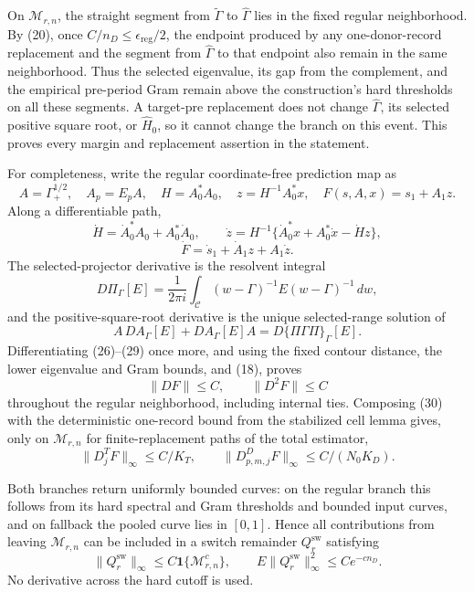 On \(\mathcal M_{r,n}\), the straight segment from
\(\widetilde\Gamma\) to \(\widehat\Gamma\) lies in the fixed regular
neighborhood.  By (20), once \(C/n_D\leq\epsilon_{\mathrm{reg}}/2\), the
endpoint produced by any one-donor-record replacement and the segment from
\(\widehat\Gamma\) to that endpoint also remain in the same neighborhood.
Thus the selected eigenvalue, its gap from the complement, and the empirical
pre-period Gram remain above the construction's hard thresholds on all these
segments.  A target-pre replacement does not change \(\widehat\Gamma\), its
selected positive square root, or \(\widehat H_0\), so it cannot change the
branch on this event.  This proves every margin and replacement assertion in
the statement.

For completeness, write the regular coordinate-free prediction map as
\[
 A=\Gamma_+^{1/2},\quad A_p=E_pA,\quad H=A_0^*A_0,
 \quad z=H^{-1}A_0^*x,
 \quad F(s,A,x)=s_1+A_1z.                              \tag{25}
\]
Along a differentiable path,
\[
 \dot H=\dot A_0^*A_0+A_0^*\dot A_0,
 \qquad
 \dot z=H^{-1}\{\dot A_0^*x+A_0^*\dot x-\dot Hz\},  \tag{26}
\]
\[
 \dot F=\dot s_1+\dot A_1z+A_1\dot z.                \tag{27}
\]
The selected-projector derivative is the resolvent integral
\[
 D\Pi_\Gamma[E]=\frac{1}{2\pi i}\int_{\mathscr C}
 (w-\Gamma)^{-1}E(w-\Gamma)^{-1}\,dw,                 \tag{28}
\]
and the positive-square-root derivative is the unique selected-range
solution of
\[
 A\,DA_\Gamma[E]+DA_\Gamma[E]A
 =D\{\Pi\Gamma\Pi\}_\Gamma[E].                        \tag{29}
\]
Differentiating (26)--(29) once more, and using the fixed contour distance,
the lower eigenvalue and Gram bounds, and (18), proves
\[
 \|DF\|\leq C,
 \qquad \|D^2F\|\leq C                                \tag{30}
\]
throughout the regular neighborhood, including internal ties.  Composing
(30) with the deterministic one-record bound from the stabilized cell lemma
gives, only on \(\mathcal M_{r,n}\) for finite-replacement paths of the total
estimator,
\[
 \|D_j^TF\|_\infty\leq C/K_T,
 \qquad
 \|D_{p,m,j}^DF\|_\infty\leq C/(N_0K_D).              \tag{31}
\]

Both branches return uniformly bounded curves: on the regular branch this
follows from its hard spectral and Gram thresholds and bounded input curves,
and on fallback the pooled curve lies in \([0,1]\).  Hence all contributions
from leaving \(\mathcal M_{r,n}\) can be included in a switch remainder
\(Q_r^{\mathrm{sw}}\) satisfying
\[
 \|Q_r^{\mathrm{sw}}\|_\infty
 \leq C\mathbf1\{\mathcal M_{r,n}^c\},
 \qquad
 E\|Q_r^{\mathrm{sw}}\|_\infty^2\leq Ce^{-cn_D}.      \tag{32}
\]
No derivative across the hard cutoff is used.


